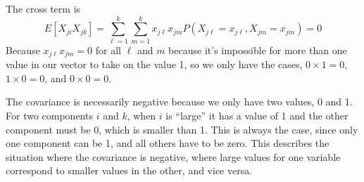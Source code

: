 \begin{enumerate}
    The cross term is
    \[
        E[X_{ji}X_{jk}]
        =
        \sum_{\ell=1}^{k}\sum_{m=1}^{k}x_{j\ell}x_{jm}P(X_{j\ell} = x_{j\ell}, X_{jm} = x_{jm})
        =
        0
    \]
    Because $x_{j\ell}x_{jm} = 0$ for all $\ell$ and $m$ because it's impossible for more than one value in our vector to take on the value 1, so we only have the cases, $0 \times 1 = 0$, $1 \times 0 = 0$, and $0 \times 0 = 0$.

    The covariance is necessarily negative because we only have two values, 0 and 1. For two components $i$ and $k$, when $i$ is ``large'' it has a value of 1 and the other component must be 0, which is smaller than 1. This is always the case, since only one component can be 1, and all others have to be zero. This describes the situation where the covariance is negative, where large values for one variable correspond to smaller values in the other, and vice versa.
\end{enumerate}
